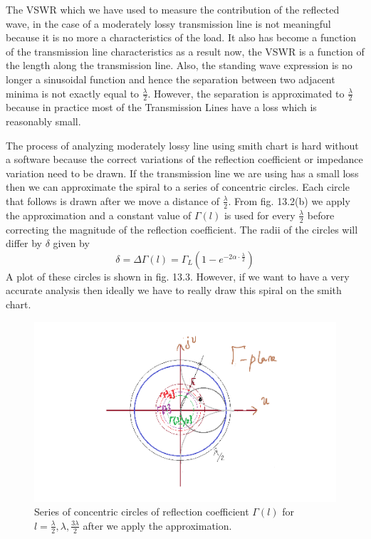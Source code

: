 The VSWR which we have used to measure the contribution of the reflected wave, in the case of a moderately lossy transmission line is not meaningful because it is no more a characteristics of the load. It also has become a function of the transmission line characteristics as a result now, the VSWR is a function of the length along the transmission line. Also, the standing wave expression is no longer a sinusoidal function and hence the separation between two adjacent minima is not exactly equal to $\frac{\lambda}{2}$. However, the separation is approximated to $\frac{\lambda}{2}$ because in practice most of the Transmission Lines have a loss which is reasonably small.

The process of analyzing moderately lossy line using smith chart is hard without a software because the correct variations of the reflection coefficient or impedance variation need to be drawn. If the transmission line we are using has a small loss then we can approximate the spiral to a series of concentric circles. Each circle that follows is drawn after we move a distance of $\frac{\lambda}{2}$. From fig. 13.2(b) we apply the approximation and a constant value of $\Gamma{(l)}$ is used for every $\frac{\lambda}{2}$ before correcting the magnitude of the reflection coefficient. The radii of the circles will differ by $\delta$ given by
\begin{dmath*}
\delta = \Delta \Gamma{(l)} = \Gamma_L(1 - e^{-2\alpha\cdot \frac{\lambda}{2}})
\end{dmath*}
A plot of these circles is shown in fig. 13.3. However, if we want to have a very accurate analysis then ideally we have to really draw this spiral on the smith chart.
\begin{figure}[ht]
\centering
\includegraphics[scale=0.4]{"./graphics/Diagram"}
\caption{Series of concentric circles of reflection coefficient $\Gamma{(l)}$ for $l = \frac{\lambda}{2},\lambda, \frac{3\lambda}{2}$ after we apply the approximation.}
\end{figure}

